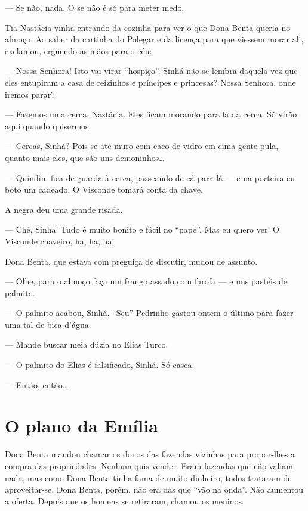 --- Se não, nada. O se não é só para meter medo.

Tia Nastácia vinha entrando da cozinha para ver o que Dona Benta queria
no almoço. Ao saber da cartinha do Polegar e da licença para que viessem
morar ali, exclamou, erguendo as mãos para o céu:

--- Nossa Senhora! Isto vai virar ``hospiço''. Sinhá não se lembra
daquela vez que eles entupiram a casa de reizinhos e príncipes e
princesas? Nossa Senhora, onde iremos parar?

--- Fazemos uma cerca, Nastácia. Eles ficam morando para lá da cerca. Só
virão aqui quando quisermos.

--- Cercas, Sinhá? Pois se até muro com caco de vidro em cima gente
pula, quanto mais eles, que são uns demoninhos\ldots{}

--- Quindim fica de guarda à cerca, passeando de cá para lá --- e na
porteira eu boto um cadeado. O Visconde tomará conta da chave.

A negra deu uma grande risada.

--- Ché, Sinhá! Tudo é muito bonito e fácil no ``papé''. Mas eu quero
ver! O Visconde chaveiro, ha, ha, ha!

Dona Benta, que estava com preguiça de discutir, mudou de assunto.

--- Olhe, para o almoço faça um frango assado com farofa --- e uns
pastéis de palmito.

--- O palmito acabou, Sinhá. ``Seu'' Pedrinho gastou ontem o último para
fazer uma tal de bica d'água.

--- Mande buscar meia dúzia no Elias Turco.

--- O palmito do Elias é falsificado, Sinhá. Só casca.

--- Então, então\ldots{}


\chapter{O plano da Emília}

Dona Benta mandou chamar os donos das fazendas vizinhas para propor-lhes
a compra das propriedades. Nenhum quis vender. Eram fazendas que não
valiam nada, mas como Dona Benta tinha fama de muito dinheiro, todos
trataram de aproveitar-se. Dona Benta, porém, não era das que ``vão na
onda''. Não aumentou a oferta. Depois que os homens se retiraram, chamou
os meninos.

